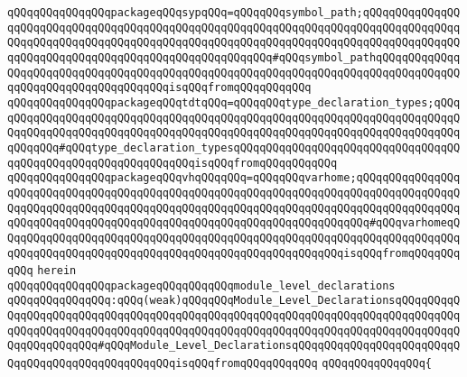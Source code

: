 \verb|qQQqqQQqqQQqqQQqpackageqQQqsypqQQq=qQQqqQQqsymbol_path;qQQqqQQqqQQqqQQqqQQqqQQqqQQqqQQqqQQqqQQqqQQqqQQqqQQqqQQqqQQqqQQqqQQqqQQqqQQqqQQqqQQqqQQqqQQqqQQqqQQqqQQqqQQqqQQqqQQqqQQqqQQqqQQqqQQqqQQqqQQqqQQqqQQqqQQqqQQqqQQqqQQqqQQqqQQqqQQqqQQqqQQqqQQqqQQqqQQq#qQQqsymbol_pathqQQqqQQqqQQqqQQqqQQqqQQqqQQqqQQqqQQqqQQqqQQqqQQqqQQqqQQqqQQqqQQqqQQqqQQqqQQqqQQqqQQqqQQqqQQqqQQqqQQqqQQqqQQqisqQQqfromqQQqqQQqqQQq|\newline
\verb|qQQqqQQqqQQqqQQqpackageqQQqtdtqQQq=qQQqqQQqtype_declaration_types;qQQqqQQqqQQqqQQqqQQqqQQqqQQqqQQqqQQqqQQqqQQqqQQqqQQqqQQqqQQqqQQqqQQqqQQqqQQqqQQqqQQqqQQqqQQqqQQqqQQqqQQqqQQqqQQqqQQqqQQqqQQqqQQqqQQqqQQqqQQqqQQqqQQqqQQq#qQQqtype_declaration_typesqQQqqQQqqQQqqQQqqQQqqQQqqQQqqQQqqQQqqQQqqQQqqQQqqQQqqQQqqQQqqQQqisqQQqfromqQQqqQQqqQQq|\newline
\verb|qQQqqQQqqQQqqQQqpackageqQQqvhqQQqqQQq=qQQqqQQqvarhome;qQQqqQQqqQQqqQQqqQQqqQQqqQQqqQQqqQQqqQQqqQQqqQQqqQQqqQQqqQQqqQQqqQQqqQQqqQQqqQQqqQQqqQQqqQQqqQQqqQQqqQQqqQQqqQQqqQQqqQQqqQQqqQQqqQQqqQQqqQQqqQQqqQQqqQQqqQQqqQQqqQQqqQQqqQQqqQQqqQQqqQQqqQQqqQQqqQQqqQQqqQQqqQQqqQQq#qQQqvarhomeqQQqqQQqqQQqqQQqqQQqqQQqqQQqqQQqqQQqqQQqqQQqqQQqqQQqqQQqqQQqqQQqqQQqqQQqqQQqqQQqqQQqqQQqqQQqqQQqqQQqqQQqqQQqqQQqqQQqqQQqqQQqisqQQqfromqQQqqQQqqQQq|\newline
\verb|herein|\newline
\newline
\newline
\verb|qQQqqQQqqQQqqQQqpackageqQQqqQQqqQQqmodule_level_declarations|\newline
\verb|qQQqqQQqqQQqqQQq:qQQq(weak)qQQqqQQqModule_Level_DeclarationsqQQqqQQqqQQqqQQqqQQqqQQqqQQqqQQqqQQqqQQqqQQqqQQqqQQqqQQqqQQqqQQqqQQqqQQqqQQqqQQqqQQqqQQqqQQqqQQqqQQqqQQqqQQqqQQqqQQqqQQqqQQqqQQqqQQqqQQqqQQqqQQqqQQqqQQqqQQqqQQqqQQq#qQQqModule_Level_DeclarationsqQQqqQQqqQQqqQQqqQQqqQQqqQQqqQQqqQQqqQQqqQQqqQQqqQQqisqQQqfromqQQqqQQqqQQq|\newline
\verb|qQQqqQQqqQQqqQQq{|\newline
